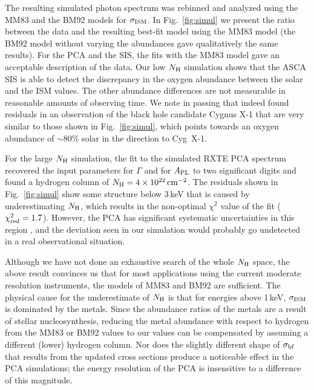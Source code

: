 \documentclass{aastex}
\newcommand{\nH}{\ensuremath{N_{\rm H}}}
\newcommand{\cm}{\ensuremath{\rm cm}}
\newcommand{\sigism}{\ensuremath{\sigma_{\rm ISM}}}
\begin{document}
The resulting simulated photon spectrum was rebinned and analyzed
using the MM83 and the BM92 models for $\sigism$. In
Fig.~\ref{fig:simul} we present the ratio between the data and the
resulting best-fit model using the MM83 model (the BM92 model without
varying the abundances gave qualitatively the same results). For the
PCA and the SIS, the fits with the MM83 model gave an acceptable
description of the data.  Our low $\nH$ simulation shows that the ASCA
SIS is able to detect the discrepancy in the oxygen abundance between
the solar and the ISM values. The other abundance differences are not
measurable in reasonable amounts of observing time. We note in passing
that \citet{ebisawa:96b} indeed found residuals in an observation of
the black hole candidate Cygnus X-1 that are very similar to those
shown in Fig.~\ref{fig:simul}, which points towards an oxygen
abundance of $\sim$80\% solar in the direction to Cyg~X-1.

For the large $\nH$ simulation, the fit to the simulated RXTE PCA
spectrum recovered the input parameters for $\Gamma$ and for
$A_{\rm PL}$ to two significant digits and found a hydrogen
column of $\nH=4\times 10^{22}\,\cm^{-2}$. The residuals shown in
Fig.~\ref{fig:simul} show some structure below 3\,keV that is
caused by underestimating $\nH$, which results in the non-optimal
$\chi^2$ value of the fit ($\chi^2_{\rm red}=1.7$). However, the
PCA has significant systematic uncertainties in this region
\citep{wilms:98c}, and the deviation seen in our simulation would
probably go undetected in a real observational situation.

Although we have not done an exhaustive search of the whole $\nH$
space, the above result convinces us that for most applications
using the current moderate resolution instruments, the models of
MM83 and BM92 are sufficient. The physical cause for the
underestimate of $\nH$ is that for energies above 1\,keV,
$\sigism$ is dominated by the metals. Since the abundance ratios
of the metals are a result of stellar nucleosynthesis, reducing
the metal abundance with respect to hydrogen from the MM83 or
BM92 values to our values can be compensated by assuming a
different (lower) hydrogen column.  Nor does the slightly
different shape of $\sigma_{\rm bf}$ that results from the
updated cross sections produce a noticeable effect in the PCA
simulations; the energy resolution of the PCA is insensitive to a
difference of this magnitude.
\end{document}
